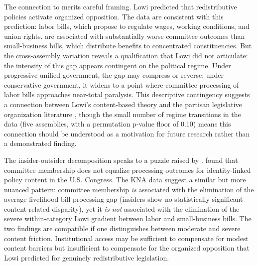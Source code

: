 \documentclass[11pt]{article}
\begin{document}
The connection to \citet{lowi1964} merits careful framing. Lowi predicted that redistributive policies activate organized opposition. The data are consistent with this prediction: labor bills, which propose to regulate wages, working conditions, and union rights, are associated with substantially worse committee outcomes than small-business bills, which distribute benefits to concentrated constituencies. But the cross-assembly variation reveals a qualification that Lowi did not articulate: the intensity of this gap appears contingent on the political regime. Under progressive unified government, the gap may compress or reverse; under conservative government, it widens to a point where committee processing of labor bills approaches near-total paralysis. This descriptive contingency suggests a connection between Lowi's content-based theory and the partisan legislative organization literature \citep{cox2005, aldrich2001}, though the small number of regime transitions in the data (five assemblies, with a permutation p-value floor of 0.10) means this connection should be understood as a motivation for future research rather than a demonstrated finding.

The insider-outsider decomposition speaks to a puzzle raised by \citet{peay2020}. \citeauthor{peay2020} found that committee membership does not equalize processing outcomes for identity-linked policy content in the U.S. Congress. The KNA data suggest a similar but more nuanced pattern: committee membership \emph{is} associated with the elimination of the average livelihood-bill processing gap (insiders show no statistically significant content-related disparity), yet it \emph{is not} associated with the elimination of the severe within-category Lowi gradient between labor and small-business bills. The two findings are compatible if one distinguishes between moderate and severe content friction. Institutional access may be sufficient to compensate for modest content barriers but insufficient to compensate for the organized opposition that Lowi predicted for genuinely redistributive legislation.
\end{document}
